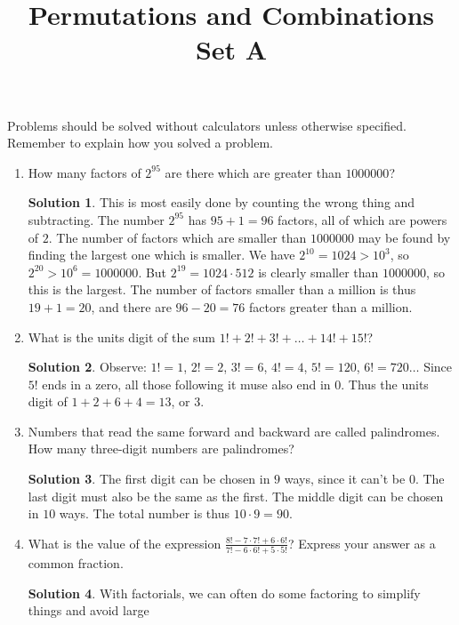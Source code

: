\documentclass{article}
\title{Permutations and Combinations Set A}
\author{}
\date{}
\theoremstyle{definition}
\newtheorem*{solution}{Solution}
\begin{document}
    \maketitle
    \noindent Problems should be solved without calculators unless otherwise specified.
    Remember to explain how you solved a problem.
    \begin{enumerate}
        \item How many factors of $2^{95}$ are there which are greater than $1000000$?
        \begin{solution}
            This is most easily done by counting the wrong thing and subtracting. The number $2^{95}$
            has $95 + 1 = 96$ factors, all of which are powers of $2$. The number of factors
            which are smaller than $1000000$ may be found by finding the largest one which is
            smaller. We have $2^{10} = 1024 > 10^3$, so $2^{20} > 10^6 = 1000000$. But
            $2^{19} = 1024 \cdot 512$ is clearly smaller than $1000000$, so this is the largest.
            The number of factors smaller than a million is thus $19 + 1 = 20$, and there are
            $96 - 20 = 76$ factors greater than a million.
        \end{solution}
        \item What is the units digit of the sum $1! + 2! + 3! + \dots + 14! + 15!$?
        \begin{solution}
            Observe: $1! = 1$, $2! = 2$, $3! = 6$, $4! = 4$, $5! = 120$, $6! = 720 \dots$
            Since $5!$ ends in a zero, all those following it muse also end in 0. Thus the units
            digit of $1 + 2 + 6 + 4 = 13$, or $3$.
        \end{solution}
        \item Numbers that read the same forward and backward are called palindromes. How many
        three-digit numbers are palindromes?
        \begin{solution}
            The first digit can be chosen in $9$ ways, since it can't be $0$. The last digit
            must also be the same as the first. The middle digit can be chosen in $10$ ways.
            The total number is thus $10 \cdot 9 = 90$.
        \end{solution}
        \item What is the value of the expression $\frac{8! - 7 \cdot 7! + 6 \cdot 6!}
        {7! - 6 \cdot 6! + 5 \cdot 5!}$? Express your answer as a common fraction.
        \begin{solution}
            With factorials, we can often do some factoring to simplify things and avoid large

\end{solution}
\end{enumerate}
\end{document}
